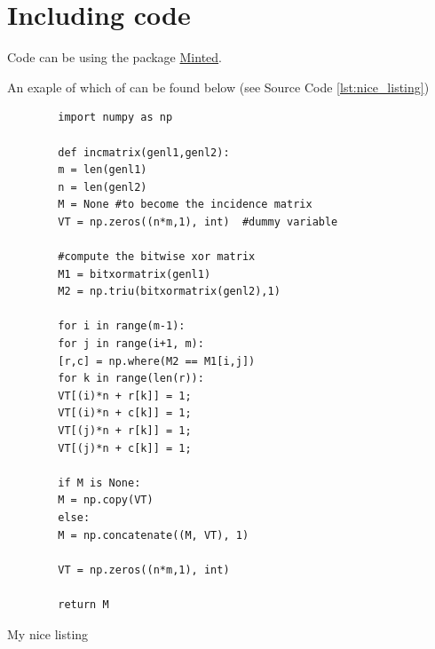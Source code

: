 \section{Including code}

Code can be using the package
\href{https://www.sharelatex.com/learn/Code\_Highlighting\_with\_minted}{Minted}.

An exaple of which of can be found below (see Source Code \ref{lst:nice_listing})
\begin{listing}
    \begin{verbatim}
        import numpy as np

        def incmatrix(genl1,genl2):
        m = len(genl1)
        n = len(genl2)
        M = None #to become the incidence matrix
        VT = np.zeros((n*m,1), int)  #dummy variable

        #compute the bitwise xor matrix
        M1 = bitxormatrix(genl1)
        M2 = np.triu(bitxormatrix(genl2),1)

        for i in range(m-1):
        for j in range(i+1, m):
        [r,c] = np.where(M2 == M1[i,j])
        for k in range(len(r)):
        VT[(i)*n + r[k]] = 1;
        VT[(i)*n + c[k]] = 1;
        VT[(j)*n + r[k]] = 1;
        VT[(j)*n + c[k]] = 1;

        if M is None:
        M = np.copy(VT)
        else:
        M = np.concatenate((M, VT), 1)

        VT = np.zeros((n*m,1), int)

        return M
    \end{verbatim}

    \caption{My nice listing}
    \label{lst:nice_listing}
\end{listing}
